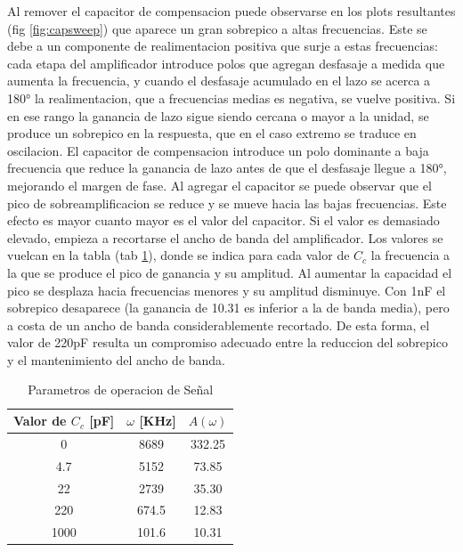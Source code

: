 \documentclass[11pt,a4paper]{article}
\begin{document}
Al remover el capacitor de compensacion puede observarse en los plots resultantes (fig \ref{fig:capsweep}) que aparece un gran sobrepico a altas frecuencias. Este se debe a un componente de realimentacion positiva que surje a estas frecuencias: cada etapa del amplificador introduce polos que agregan desfasaje a medida que aumenta la frecuencia, y cuando el desfasaje acumulado en el lazo se acerca a 180° la realimentacion, que a frecuencias medias es negativa, se vuelve positiva. Si en ese rango la ganancia de lazo sigue siendo cercana o mayor a la unidad, se produce un sobrepico en la respuesta, que en el caso extremo se traduce en oscilacion. El capacitor de compensacion introduce un polo dominante a baja frecuencia que reduce la ganancia de lazo antes de que el desfasaje llegue a 180°, mejorando el margen de fase. Al agregar el capacitor se puede observar que el pico de sobreamplificacion se reduce y se mueve hacia las bajas frecuencias. Este efecto es mayor cuanto mayor es el valor del capacitor. Si el valor es demasiado elevado, empieza a recortarse el ancho de banda del amplificador. Los valores se vuelcan en la tabla (tab \ref{tab:cap}), donde se indica para cada valor de \(C_c\) la frecuencia a la que se produce el pico de ganancia y su amplitud. Al aumentar la capacidad el pico se desplaza hacia frecuencias menores y su amplitud disminuye. Con 1nF el sobrepico desaparece (la ganancia de 10.31 es inferior a la de banda media), pero a costa de un ancho de banda considerablemente recortado. De esta forma, el valor de 220pF resulta un compromiso adecuado entre la reduccion del sobrepico y el mantenimiento del ancho de banda.


\begin{table}
\centering
\begin{tabular}{ |c|c|c| } \hline
Valor de \(C_c\) [pF] & \(\omega\) [KHz] & \(A(\omega)\) \\ \hline         
0                     & 8689             & 332.25        \\ \hline 
4.7                   & 5152             & 73.85         \\ \hline 
22                    & 2739             & 35.30         \\ \hline 
220                   & 674.5            & 12.83         \\ \hline 
1000                  & 101.6            & 10.31         \\ \hline 
\end{tabular}
\caption {Parametros de operacion de Señal}
\label{tab:cap} 
\end{table}
\end{document}
